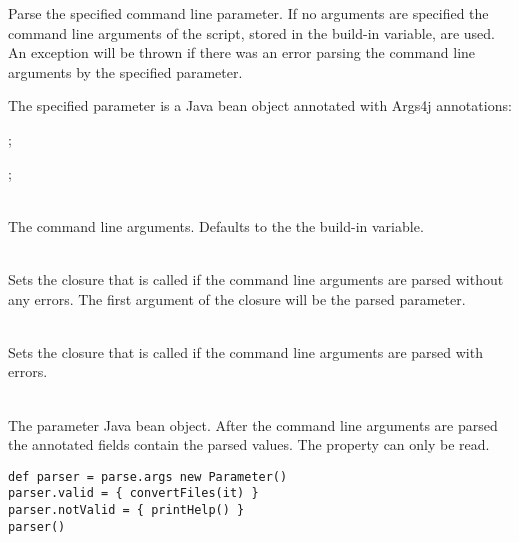 %


Parse the specified command line parameter. If no 
arguments are specified the command line arguments of the script, stored in
the  build-in variable, are used.
An exception will be thrown if there was an error parsing the command line arguments
by the specified parameter.

The specified parameter is a Java bean object annotated with 
Args4j\cite{args4j13} annotations:
\begin{inparaitem}
\item {};
\item {};
\end{inparaitem}

\begin{asparadesc}
%
\item[\code{arguments: array|list}] \hfill \\
The command line arguments. Defaults to the the  build-in variable.
%
\item[\code{valid: closure}] \hfill \\
Sets the closure that is called if the command line arguments are parsed without
any errors. The first argument of the closure will be the parsed parameter.
%
\item[\code{notValid: closure}] \hfill \\
Sets the closure that is called if the command line arguments are parsed with
errors.
%
\item[\code{theParameter}] \hfill \\
The parameter Java bean object. After the command line arguments are parsed
the annotated fields contain the parsed values. The property can only be read.
%
\end{asparadesc}

\begin{lstlisting}[style=Groovybash, label={lst:example_arguments_parse}, title={%
\Command{parse} command: storing the parse command in a variable and set 
the arguments and parse the command line arguments at a later point.}]
def parser = parse.args new Parameter()
parser.valid = { convertFiles(it) }
parser.notValid = { printHelp() }
parser()
\end{lstlisting}

